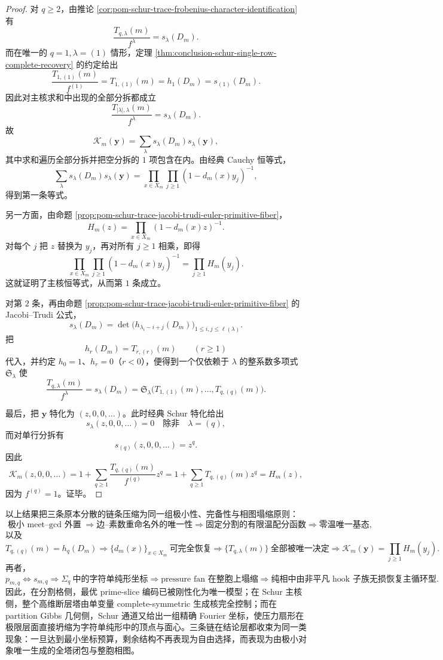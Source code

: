 \begin{proof}
对 \(q\ge 2\)，由推论 \ref{cor:pom-schur-trace-frobenius-character-identification} 有
\[
\frac{T_{q,\lambda}(m)}{f^\lambda}=s_\lambda(D_m).
\]
而在唯一的 \(q=1,\lambda=(1)\) 情形，定理 \ref{thm:conclusion-schur-single-row-complete-recovery} 的约定给出
\[
\frac{T_{1,(1)}(m)}{f^{(1)}}=T_{1,(1)}(m)=h_1(D_m)=s_{(1)}(D_m).
\]
因此对主核求和中出现的全部分拆都成立
\[
\frac{T_{|\lambda|,\lambda}(m)}{f^\lambda}=s_\lambda(D_m).
\]
故
\[
\mathcal K_m(\mathbf y)
=
\sum_{\lambda}s_\lambda(D_m)s_\lambda(\mathbf y),
\]
其中求和遍历全部分拆并把空分拆的 \(1\) 项包含在内。由经典 Cauchy 恒等式，
\[
\sum_{\lambda}s_\lambda(D_m)s_\lambda(\mathbf y)
=
\prod_{x\in X_m}\prod_{j\ge 1}(1-d_m(x)y_j)^{-1},
\]
得到第一条等式。

另一方面，由命题 \ref{prop:pom-schur-trace-jacobi-trudi-euler-primitive-fiber}，
\[
H_m(z)=\prod_{x\in X_m}(1-d_m(x)z)^{-1}.
\]
对每个 \(j\) 把 \(z\) 替换为 \(y_j\)，再对所有 \(j\ge 1\) 相乘，即得
\[
\prod_{x\in X_m}\prod_{j\ge 1}(1-d_m(x)y_j)^{-1}
=
\prod_{j\ge 1}H_m(y_j).
\]
这就证明了主核恒等式，从而第 \(1\) 条成立。

对第 \(2\) 条，再由命题 \ref{prop:pom-schur-trace-jacobi-trudi-euler-primitive-fiber} 的 Jacobi--Trudi 公式，
\[
s_\lambda(D_m)=\det\bigl(h_{\lambda_i-i+j}(D_m)\bigr)_{1\le i,j\le \ell(\lambda)}.
\]
把
\[
h_r(D_m)=T_{r,(r)}(m)
\qquad
(r\ge 1)
\]
代入，并约定 \(h_0=1\)、\(h_r=0\)（\(r<0\)），便得到一个仅依赖于 \(\lambda\) 的整系数多项式 \(\mathfrak S_\lambda\) 使
\[
\frac{T_{q,\lambda}(m)}{f^\lambda}=s_\lambda(D_m)
=
\mathfrak S_\lambda\bigl(T_{1,(1)}(m),\dots,T_{q,(q)}(m)\bigr).
\]

最后，把 \(\mathbf y\) 特化为 \((z,0,0,\dots)\)。此时经典 Schur 特化给出
\[
s_\lambda(z,0,0,\dots)=0
\quad\text{除非}\quad
\lambda=(q),
\]
而对单行分拆有
\[
s_{(q)}(z,0,0,\dots)=z^q.
\]
因此
\[
\mathcal K_m(z,0,0,\dots)
=
1+\sum_{q\ge 1}\frac{T_{q,(q)}(m)}{f^{(q)}}z^q
=
1+\sum_{q\ge 1}T_{q,(q)}(m)z^q
=
H_m(z),
\]
因为 \(f^{(q)}=1\)。证毕。
\end{proof}



\noindent
以上结果把三条原本分散的链条压缩为同一组极小性、完备性与相图塌缩原则：
\[
\text{极小 meet--\(\gcd\) 外置}
\Longrightarrow
\text{边--素数重命名外的唯一性}
\Longrightarrow
\text{固定分割的有限温配分函数}
\Longrightarrow
\text{零温唯一基态},
\]
以及
\[
T_{q,(q)}(m)=h_q(D_m)
\Longrightarrow
\{d_m(x)\}_{x\in X_m}\ \text{可完全恢复}
\Longrightarrow
\{T_{q,\lambda}(m)\}\ \text{全部被唯一决定}
\Longrightarrow
\mathcal K_m(\mathbf y)=\prod_{j\ge 1}H_m(y_j).
\]
再者，
\[
p_{m,q}
\Longleftrightarrow
s_{m,q}
\Longrightarrow
\Sigma_q\ \text{中的字符单纯形坐标}
\Longrightarrow
\text{pressure fan 在整胞上塌缩}
\Longrightarrow
\text{纯相中由非平凡 hook 子族无损恢复主循环型}.
\]
因此，在分割格侧，最优 prime-slice 编码已被刚性化为唯一模型；在 Schur 主核侧，整个高维断层塔由单变量 complete-symmetric 生成核完全控制；而在 partition Gibbs 几何侧，Schur 通道又给出一组精确 Fourier 坐标，使压力扇形在极限层面直接坍缩为字符单纯形中的顶点与面心。三条链在结论层都收束为同一类现象：一旦达到最小坐标预算，剩余结构不再表现为自由选择，而表现为由极小对象唯一生成的全塔闭包与整胞相图。

\endinput
